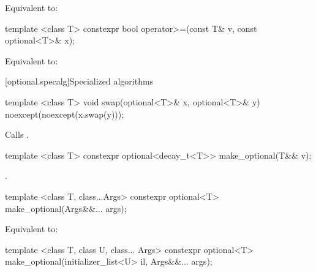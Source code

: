 \begin{itemdescr}
\pnum
\effects
Equivalent to: 
\end{itemdescr}

%
\begin{itemdecl}
template <class T> constexpr bool operator>=(const T& v, const optional<T>& x);
\end{itemdecl}

\begin{itemdescr}
\pnum
\effects
Equivalent to: 
\end{itemdescr}


[optional.specalg]{Specialized algorithms}

%
\begin{itemdecl}
template <class T> void swap(optional<T>& x, optional<T>& y) noexcept(noexcept(x.swap(y)));
\end{itemdecl}

\begin{itemdescr}
\pnum
\effects
Calls .
\end{itemdescr}

%
\begin{itemdecl}
template <class T> constexpr optional<decay_t<T>> make_optional(T&& v);
\end{itemdecl}

\begin{itemdescr}
\pnum
\returns
{}.
\end{itemdescr}

%
\begin{itemdecl}
template <class T, class...Args>
  constexpr optional<T> make_optional(Args&&... args);
\end{itemdecl}

\begin{itemdescr}
\pnum
\effects Equivalent to: 
\end{itemdescr}

%
\begin{itemdecl}
template <class T, class U, class... Args>
  constexpr optional<T> make_optional(initializer_list<U> il, Args&&... args);
\end{itemdecl}

